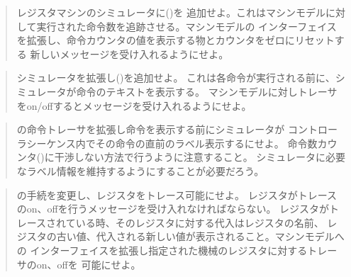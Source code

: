 \begin{quote}
レジスタマシンのシミュレータに()を
追加せよ。これはマシンモデルに対して実行された命令数を追跡させる。マシンモデルの
インターフェイスを拡張し、命令カウンタの値を表示する物とカウンタをゼロにリセットする
新しいメッセージを受け入れるようにせよ。
\end{quote}

\begin{quote}
シミュレータを拡張し()を追加せよ。
これは各命令が実行される前に、シミュレータが命令のテキストを表示する。
マシンモデルに対しトレーサをon/offするとメッセージを受け入れるようにせよ。
\end{quote}

\begin{quote}
の命令トレーサを拡張し命令を表示する前にシミュレータが
コントローラシーケンス内でその命令の直前のラベル表示するにせよ。
命令数カウンタ()に干渉しない方法で行うように注意すること。
シミュレータに必要なラベル情報を維持するようにすることが必要だろう。
\end{quote}

\begin{quote}
の手続を変更し、レジスタをトレース可能にせよ。
レジスタがトレースのon、offを行うメッセージを受け入れなければならない。
レジスタがトレースされている時、そのレジスタに対する代入はレジスタの名前、
レジスタの古い値、代入される新しい値が表示されること。マシンモデルへの
インターフェイスを拡張し指定された機械のレジスタに対するトレーサのon、offを
可能にせよ。
\end{quote}

